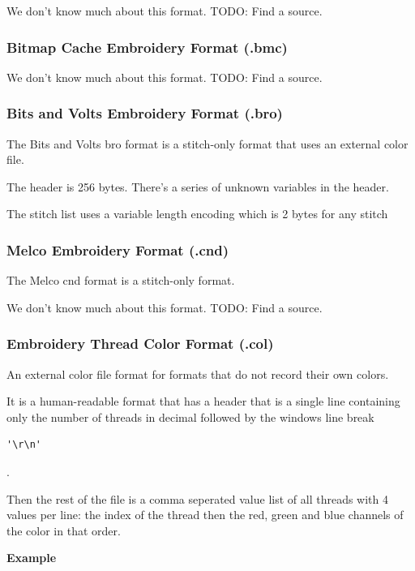\documentclass[a4paper, 11pt]{report}
\begin{document}
We don't know much about this format. TODO: Find a source.

\subsubsection{Bitmap Cache Embroidery Format (.bmc)}

We don't know much about this format. TODO: Find a source.

\subsubsection{Bits and Volts Embroidery Format (.bro)}

The Bits and Volts bro format is a stitch-only format that uses an external color file.

The header is 256 bytes. There's a series of unknown variables in the header.

The stitch list uses a variable length encoding which is 2 bytes for any stitch

\subsubsection{Melco Embroidery Format (.cnd)}

The Melco cnd format is a stitch-only format.

We don't know much about this format. TODO: Find a source.

\subsubsection{Embroidery Thread Color Format (.col)}

An external color file format for formats that do not record their own colors. 

It is a human-readable format that has a header that is a single line containing only the number of threads in decimal followed by the windows line break \begin{verbatim}'\r\n'\end{verbatim}.

Then the rest of the file is a comma seperated value list of all threads with 4 values per line: the index of the thread then the red, green and blue channels of the color in that order.

\begin{flushleft}
\textbf{Example}
\end{flushleft}
\end{document}
